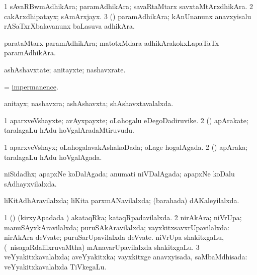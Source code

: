\bentry
{}
\gl{\nA}
\expl{\Latin }
\bmng
\bnum
\num{1} sAvaRBwmAdhikAra; paramAdhikAra; savaRtaMtarx savxtaMtArxdhikAra. 
\num{2} cakArxdhipatayx; sAmArxjayx. 
\num{3} (\nAyxshA) paramAdhikAra; kAnUnanunx anavxyisalu rASaTxrXbalavanunx baLasuva adhikAra. 
\enum
\emng
\eentry

\bentry
{}
\gl{\nA}
\expl{\Latin }
\bmng
parataMtarx paramAdhikAra; matotxMdara adhikArakokxLapaTaTx paramAdhikAra. 
\emng
\eentry

\bentry
{}
\gl{\nA}
\bmng
ashAshavxtate; anitayxte; nashavxrate. 
\emng
\eentry

\bentry
{}
\gl{\nA}
\bmng
 = \hyperlink{impermanence}{impermanence}. 
\emng
\eentry

\bentry
{}
\gl{\gu}
\bmng
anitayx; nashavxra; ashAshavxta; shAshavxtavalalxda. 
\emng
\eentry

\bentry
{}
\gl{\nA}
\bmng
\bnum
\num{1} aparxveVshayxte; avAyxpayxte; oLahogalu eDegoDadiruvike. 
\num{2} (\Bwvi) apArakate; taralagaLu  hAdu hoVgalAradaMtiruvudu. 
\enum
\emng
\eentry

\bentry
{}
\gl{\gu}
\bmng
\bnum
\num{1} aparxveVshayx; oLahogalavakAshakoDada; oLage hogalAgada. 
\num{2} (\Bwvi) apAraka; taralagaLu  hAdu hoVgalAgada. 
\enum
\emng
\eentry

\bentry
{}
\gl{\gu}
\bmng
niSidadhx; apapxNe koDalAgada; anumati niVDalAgada; apapxNe koDalu sAdhayxvilalxda. 
\emng
\eentry

\bentry
{}
\gl{\gu}
\bmng
liKitAdhAravilalxda; liKita parxmANavilalxda; (barahada) dAKaleyilalxda. 
\emng
\eentry

\bentry
{}
\gl{\gu}
\bmng
\bnum
\num{1} (\vAyx) (kirxyApadada \vi) akataqRka; kataqRpadavilalxda. 
\num{2} nirAkAra; niVrUpa; manuSAyxkAravilalxda; puruSAkAravilalxda; vayxkitxsavxrUpavilalxda:  nirAkAra deVvate; puruSarUpavilalxda deVvate.  niVrUpa shakitxgaLu, (\udA\ nisagaRdalilxruvaMtha) mAnavarUpavilalxda shakitxgaLu. 
\num{3} veYyakitxkavalalxda; aveYyakitxka; vayxkitxge anavxyisada, saMbaMdhisada:  veYyakitxkavalalxda TiVkegaLu. 
\enum
\emng
\eentry

